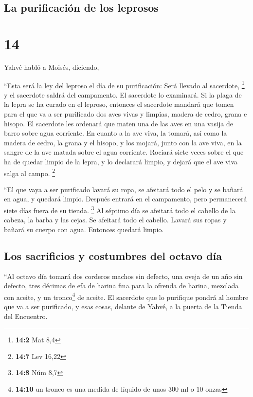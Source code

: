 \begin{paracol}{2}
\hypertarget{la-purificaciuxf3n-de-los-leprosos}{%
\subsection{La purificación de los
leprosos}\label{la-purificaciuxf3n-de-los-leprosos}}

\hypertarget{section-26}{%
\section{14}\label{section-26}}

 Yahvé habló a Moisés, diciendo,

 ``Esta será la ley del leproso el día de su purificación:
Será llevado al sacerdote, \footnote{\textbf{14:2} Mat 8,4}
 y el sacerdote saldrá del campamento. El sacerdote lo
examinará. Si la plaga de la lepra se ha curado en el leproso,
 entonces el sacerdote mandará que tomen para el que va a
ser purificado dos aves vivas y limpias, madera de cedro, grana e
hisopo.  El sacerdote les ordenará que maten una de las
aves en una vasija de barro sobre agua corriente.  En
cuanto a la ave viva, la tomará, así como la madera de cedro, la grana y
el hisopo, y los mojará, junto con la ave viva, en la sangre de la ave
matada sobre el agua corriente.  Rociará siete veces sobre
el que ha de quedar limpio de la lepra, y lo declarará limpio, y dejará
que el ave viva salga al campo. \footnote{\textbf{14:7} Lev 16,22}

 ``El que vaya a ser purificado lavará su ropa, se
afeitará todo el pelo y se bañará en agua, y quedará limpio. Después
entrará en el campamento, pero permanecerá siete días fuera de su
tienda. \footnote{\textbf{14:8} Núm 8,7}  Al séptimo día
se afeitará todo el cabello de la cabeza, la barba y las cejas. Se
afeitará todo el cabello. Lavará sus ropas y bañará su cuerpo con agua.
Entonces quedará limpio.

\hypertarget{los-sacrificios-y-costumbres-del-octavo-duxeda}{%
\subsection{Los sacrificios y costumbres del octavo
día}\label{los-sacrificios-y-costumbres-del-octavo-duxeda}}

 ``Al octavo día tomará dos corderos machos sin defecto,
una oveja de un año sin defecto, tres décimas de efa de harina fina para
la ofrenda de harina, mezclada con aceite, y un tronco\footnote{\textbf{14:10}
  un tronco es una medida de líquido de unos 300 ml o 10 onzas} de
aceite.  El sacerdote que lo purifique pondrá al hombre
que va a ser purificado, y esas cosas, delante de Yahvé, a la puerta de
la Tienda del Encuentro.


\end{paracol}
